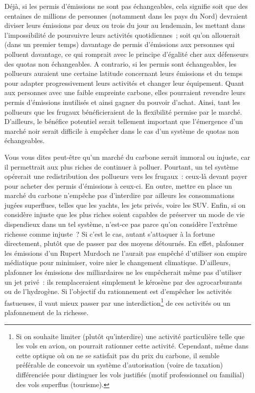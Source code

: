 \documentclass[a5paper,french,openany]{memoir}
\begin{document}
Déjà, si les permis d'émissions ne sont pas échangeables, cela signifie soit que des centaines de millions de personnes (notamment dans les pays du Nord) devraient diviser leurs émissions par deux ou trois du jour au lendemain, les mettant dans l'impossibilité de poursuivre leurs activités quotidiennes~; soit qu'on allouerait (dans un premier temps) davantage de permis d'émissions aux personnes qui polluent davantage, ce qui romprait avec le principe d'égalité cher aux défenseurs des quotas non échangeables. A contrario, si les permis sont échangeables, les pollueurs auraient une certaine latitude concernant leurs émissions et du temps pour adapter progressivement leurs activités et changer leur équipement. Quant aux personnes avec une faible empreinte carbone, elles pourraient revendre leurs permis d'émissions inutilisés et ainsi gagner du pouvoir d'achat. Ainsi, tant les pollueurs que les frugaux bénéficieraient de la flexibilité permise par le marché. D'ailleurs, le bénéfice potentiel serait tellement important que l'émergence d'un marché noir serait difficile à empêcher dans le cas d'un système de quotas non échangeables. 

Vous vous dites peut-être qu'un marché du carbone serait immoral ou injuste, car il permettrait aux plus riches de continuer à polluer. Pourtant, un tel système opérerait une redistribution des pollueurs vers les frugaux~: ceux-là devant payer pour acheter des permis d'émissions à ceux-ci. En outre, mettre en place un marché du carbone n'empêche pas d'interdire par ailleurs les consommations jugées superflues, telles que les yachts, les jets privés, voire les SUV. Enfin, si on considère injuste que les plus riches soient capables de préserver un mode de vie dispendieux dans un tel système, n'est-ce pas parce qu'on considère l'extrême richesse comme injuste~? Si c'est le cas, autant s'attaquer à la fortune directement, plutôt que de passer par des moyens détournés. En effet, plafonner les émissions d'un Rupert Murdoch ne l'aurait pas empêché d'utiliser son empire médiatique pour minimiser, voire nier le changement climatique. D'ailleurs, plafonner les émissions des milliardaires ne les empêcherait même pas d'utiliser un jet privé~: ils remplaceraient simplement le kérosène par des agrocarburants ou de l'hydrogène. Si l'objectif du rationnement est d'empêcher les activités fastueuses, %
il vaut mieux passer par une interdiction\footnote{Si on souhaite limiter (plutôt qu'interdire) une activité particulière telle que les vols en avion, on pourrait rationner cette activité. Cependant, même dans cette optique où on ne se satisfait pas du prix du carbone, il semble préférable de concevoir un système d'autorisation (voire de taxation) différenciée pour distinguer les vols justifiés (motif professionnel ou familial) des vols superflus (tourisme). 
} de ces activités ou un plafonnement de la richesse.  %
\end{document}
